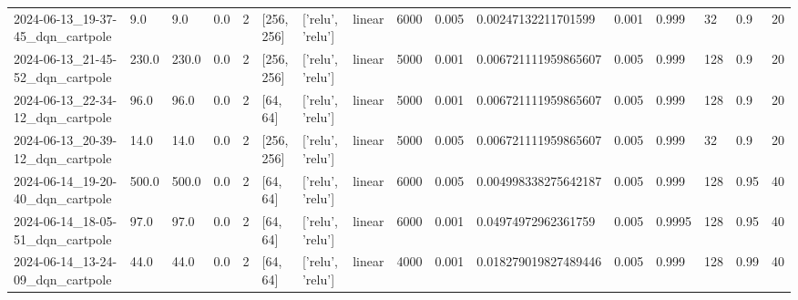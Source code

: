 \documentclass[a4paper,12pt]{article}
\begin{document}
\begin{table}[]
\begin{tabular}{llllllllllllllll}
    2024-06-13\_19-37-45\_dqn\_cartpole & 9.0                   & 9.0                     & 0.0                    & 2              & {[}256, 256{]}           & {[}'relu', 'relu'{]}                 & linear                    & 6000          & 0.005          & 0.00247132211701599  & 0.001        & 0.999          & 32          & 0.9      & 20                    \\
    2024-06-13\_21-45-52\_dqn\_cartpole & 230.0                 & 230.0                   & 0.0                    & 2              & {[}256, 256{]}           & {[}'relu', 'relu'{]}                 & linear                    & 5000          & 0.001          & 0.006721111959865607 & 0.005        & 0.999          & 128         & 0.9      & 20                    \\
    2024-06-13\_22-34-12\_dqn\_cartpole & 96.0                  & 96.0                    & 0.0                    & 2              & {[}64, 64{]}             & {[}'relu', 'relu'{]}                 & linear                    & 5000          & 0.001          & 0.006721111959865607 & 0.005        & 0.999          & 128         & 0.9      & 20                    \\
    2024-06-13\_20-39-12\_dqn\_cartpole & 14.0                  & 14.0                    & 0.0                    & 2              & {[}256, 256{]}           & {[}'relu', 'relu'{]}                 & linear                    & 5000          & 0.005          & 0.006721111959865607 & 0.005        & 0.999          & 32          & 0.9      & 20                    \\
    2024-06-14\_19-20-40\_dqn\_cartpole & 500.0                 & 500.0                   & 0.0                    & 2              & {[}64, 64{]}             & {[}'relu', 'relu'{]}                 & linear                    & 6000          & 0.005          & 0.004998338275642187 & 0.005        & 0.999          & 128         & 0.95     & 40                    \\
    2024-06-14\_18-05-51\_dqn\_cartpole & 97.0                  & 97.0                    & 0.0                    & 2              & {[}64, 64{]}             & {[}'relu', 'relu'{]}                 & linear                    & 6000          & 0.001          & 0.04974972962361759  & 0.005        & 0.9995         & 128         & 0.95     & 40                    \\
    2024-06-14\_13-24-09\_dqn\_cartpole & 44.0                  & 44.0                    & 0.0                    & 2              & {[}64, 64{]}             & {[}'relu', 'relu'{]}                 & linear                    & 4000          & 0.001          & 0.018279019827489446 & 0.005        & 0.999          & 128         & 0.99     & 40                    \\

\end{tabular}
\end{table}
\end{document}

